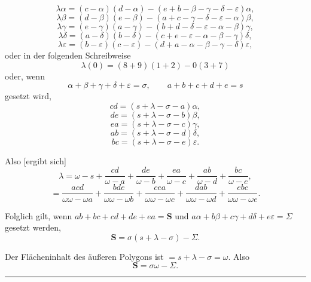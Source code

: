 
\[
\lambda\alpha=(c-\alpha)(d-\alpha)-(e+b-\beta-\gamma-\delta-\varepsilon)\alpha,
\]
\[
\lambda \beta=(d-\beta)(e-\beta)-(a+c-\gamma-\delta-\varepsilon-\alpha)\beta,
\]
\[
\lambda \gamma=(e-\gamma)(a-\gamma)-(b+d-\delta-\varepsilon-\alpha-\beta)\gamma,
\]
\[
\lambda \delta=(a-\delta)(b-\delta)-(c+e-\varepsilon-\alpha-\beta-\gamma)\delta,
\]
\[
\lambda \varepsilon=(b-\varepsilon)(c-\varepsilon)-(d+a-\alpha-\beta-\gamma-\delta)\varepsilon,
\]
oder in der folgenden Schreibweise
\[
\lambda(0)=(8+9)(1+2)-0(3+7)
\]
oder, wenn
\[
\alpha+\beta+\gamma+\delta+\varepsilon=\sigma, \qquad a+b+c+d+e=s
\]
gesetzt wird,
\[
cd=(s+\lambda-\sigma-a)\alpha,
\]
\[
de=(s+\lambda-\sigma-b)\beta,
\]
\[
ea=(s+\lambda-\sigma-c)\gamma,
\]
\[
ab=(s+\lambda-\sigma-d)\delta,
\]
\[
bc=(s+\lambda-\sigma-e)\varepsilon.
\]

Also [ergibt sich]
\[
\lambda=\omega-s+\frac{cd}{\omega-a}+\frac{de}{\omega-b}+\frac{ea}{\omega-c}+\frac{ab}{\omega-d}+\frac{bc}{\omega-e},
\]
\[
=\frac{acd}{\omega\omega-\omega a}+\frac{bde}{\omega\omega-\omega b}+\frac{cea}{\omega\omega-\omega c}+\frac{dab}{\omega\omega-\omega d}+\frac{ebc}{\omega\omega-\omega e}.
\]

Folglich gilt, wenn $ab+bc+cd+de+ea=\boldsymbol{S}$ und $a\alpha+b\beta+c\gamma+d\delta+e\varepsilon=\Sigma$ gesetzt werden,
\[
\boldsymbol{S}=\sigma(s+\lambda-\sigma)-\Sigma.
\]

Der Flächeninhalt des äußeren Polygons ist $=s+\lambda-\sigma=\omega$. Also
\[
\boldsymbol{S}=\sigma\omega-\Sigma.
\]

\begin{center}\rule{3cm}{.4pt}\end{center}
